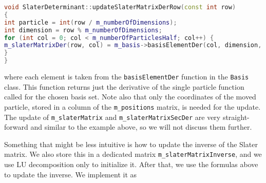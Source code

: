 \begin{lstlisting}[language={c++}]
void SlaterDeterminant::updateSlaterMatrixDerRow(const int row)
{
int particle = int(row / m_numberOfDimensions);
int dimension = row % m_numberOfDimensions;
for (int col = 0; col < m_numberOfParticlesHalf; col++) {
m_slaterMatrixDer(row, col) = m_basis->basisElementDer(col, dimension, m_positions.col(particle));
}
}
\end{lstlisting}
where each element is taken from the \lstinline{basisElementDer} function in the \lstinline{Basis} class. This function returns just the derivative of the single particle function called for the chosen basis set. Note also that only the coordinates of the moved particle, stored in a column of the \lstinline{m_positions} matrix, is needed for the update. The update of \lstinline{m_slaterMatrix} and \lstinline{m_slaterMatrixSecDer} are very straight-forward and similar to the example above, so we will not discuss them further.

Something that might be less intuitive is how to update the inverse of the Slater matrix. We also store this in a dedicated matrix \lstinline{m_slaterMatrixInverse}, and we use LU decomposition only to initialize it. After that, we use the formulas above to update the inverse. We implement it as

